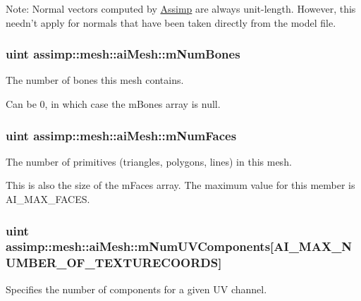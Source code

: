 Note\+: Normal vectors computed by \hyperlink{class_assimp}{Assimp} are always unit-\/length. However, this needn't apply for normals that have been taken directly from the model file. \hypertarget{structassimp_1_1mesh_1_1ai_mesh_a18532474ca4579a63506507ab4600c26}{
\subsubsection[{m\+Num\+Bones}]{\setlength{\rightskip}{0pt plus 5cm}uint assimp\+::mesh\+::ai\+Mesh\+::m\+Num\+Bones}}\label{structassimp_1_1mesh_1_1ai_mesh_a18532474ca4579a63506507ab4600c26}
The number of bones this mesh contains.

Can be 0, in which case the {\ttfamily m\+Bones} array is null. \hypertarget{structassimp_1_1mesh_1_1ai_mesh_af29ef83dde764d0a269a219b61381ab6}{
\subsubsection[{m\+Num\+Faces}]{\setlength{\rightskip}{0pt plus 5cm}uint assimp\+::mesh\+::ai\+Mesh\+::m\+Num\+Faces}}\label{structassimp_1_1mesh_1_1ai_mesh_af29ef83dde764d0a269a219b61381ab6}
The number of primitives (triangles, polygons, lines) in this mesh.

This is also the size of the {\ttfamily m\+Faces} array. The maximum value for this member is {\ttfamily A\+I\+\_\+\+M\+A\+X\+\_\+\+F\+A\+C\+E\+S}. \hypertarget{structassimp_1_1mesh_1_1ai_mesh_aa0fe74d498ea8118b8d628a30b63d4d3}{
\subsubsection[{m\+Num\+U\+V\+Components}]{\setlength{\rightskip}{0pt plus 5cm}uint assimp\+::mesh\+::ai\+Mesh\+::m\+Num\+U\+V\+Components\mbox{[}{\bf A\+I\+\_\+\+M\+A\+X\+\_\+\+N\+U\+M\+B\+E\+R\+\_\+\+O\+F\+\_\+\+T\+E\+X\+T\+U\+R\+E\+C\+O\+O\+R\+D\+S}\mbox{]}}}\label{structassimp_1_1mesh_1_1ai_mesh_aa0fe74d498ea8118b8d628a30b63d4d3}
Specifies the number of components for a given U\+V channel.

